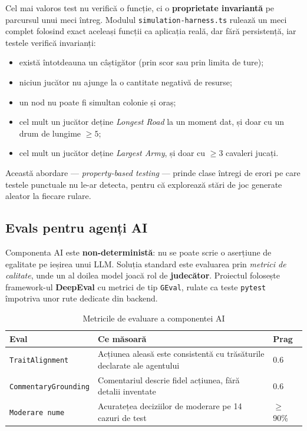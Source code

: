 \documentclass[11pt,a4paper]{article}
\begin{document}
Cel mai valoros test nu verifică o funcție, ci o \textbf{proprietate invariantă}
pe parcursul unui meci întreg. Modulul \texttt{simulation-harness.ts} rulează un
meci complet folosind exact aceleași funcții ca aplicația reală, dar fără
persistență, iar testele verifică invarianți:

\begin{itemize}
  \item există întotdeauna un câștigător (prin scor sau prin limita de ture);
  \item niciun jucător nu ajunge la o cantitate negativă de resurse;
  \item un nod nu poate fi simultan colonie și oraș;
  \item cel mult un jucător deține \textit{Longest Road} la un moment dat,
        și doar cu un drum de lungime $\geq 5$;
  \item cel mult un jucător deține \textit{Largest Army}, și doar cu
        $\geq 3$ cavaleri jucați.
\end{itemize}

Această abordare --- \textit{property-based testing} --- prinde clase întregi de
erori pe care testele punctuale nu le-ar detecta, pentru că explorează stări de
joc generate aleator la fiecare rulare.

\subsection{Evals pentru agenți AI}

Componenta AI este \textbf{non-deterministă}: nu se poate scrie o aserțiune de
egalitate pe ieșirea unui LLM. Soluția standard este evaluarea prin
\textit{metrici de calitate}, unde un al doilea model joacă rol de
\textbf{judecător}. Proiectul folosește framework-ul \textbf{DeepEval} cu metrici
de tip \texttt{GEval}, rulate ca teste \texttt{pytest} împotriva unor rute
dedicate din backend.

\begin{table}[H]
\centering
\begin{tabularx}{\textwidth}{@{}l X l@{}}
\toprule
\textbf{Eval} & \textbf{Ce măsoară} & \textbf{Prag} \\
\midrule
\texttt{TraitAlignment} & Acțiunea aleasă este consistentă cu trăsăturile declarate ale agentului & 0.6 \\
\texttt{CommentaryGrounding} & Comentariul descrie fidel acțiunea, fără detalii inventate & 0.6 \\
\texttt{Moderare nume} & Acuratețea deciziilor de moderare pe 14 cazuri de test & $\geq$ 90\% \\
\bottomrule
\end{tabularx}
\caption{Metricile de evaluare a componentei AI}
\end{table}
\end{document}
